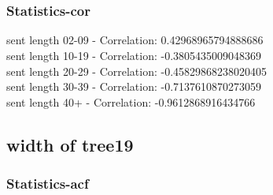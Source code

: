 \documentclass{article}%
\begin{document}
\begin{figure}[ht]%
\centering%
\setlength{\abovecaptionskip}{-35pt}%
%
%
\\%
%
%
\\%
%
\end{figure}

%
\newpage%
\subsubsection{Statistics{-}cor}%
\label{ssubsec:Statistics{-}cor}%
\noindent%
sent length 02-09 - Correlation: 0.42968965794888686\\%
sent length 10-19 - Correlation: -0.3805435009048369\\%
sent length 20-29 - Correlation: -0.45829868238020405\\%
sent length 30-39 - Correlation: -0.7137610870273059\\%
sent length 40+ - Correlation: -0.9612868916434766\\

%
\newpage

%
\subsection{width of tree19}%
\label{subsec:widthoftree19}%
\subsubsection{Statistics{-}acf}%
\label{ssubsec:Statistics{-}acf}%
\end{document}
